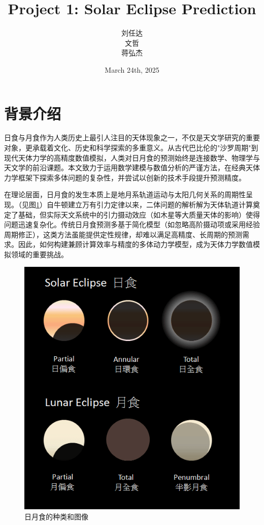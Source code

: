 \documentclass[hidelinks]{article}
\title{\textbf{Project 1: Solar Eclipse Prediction}}
\author{刘任达\\文哲\\蒋弘杰}
\date{March 24th, 2025}
\begin{document}
\hypersetup{bookmarksnumbered=true,}
\maketitle
\setcounter{tocdepth}{2}
\begin{Large}
\tableofcontents
\end{Large}%
\pagebreak

\section{背景介绍}
日食与月食作为人类历史上最引人注目的天体现象之一，不仅是天文学研究的重要对象，更承载着文化、历史和科学探索的多重意义。从古代巴比伦的"沙罗周期"到现代天体力学的高精度数值模拟，人类对日月食的预测始终是连接数学、物理学与天文学的前沿课题。本文致力于运用数学建模与数值分析的严谨方法，在经典天体力学框架下探索多体问题的复杂性，并尝试以创新的技术手段提升预测精度。

在理论层面，日月食的发生本质上是地月系轨道运动与太阳几何关系的周期性呈现。（见图\ref{fig:eclipse}）自牛顿建立万有引力定律以来，二体问题的解析解为天体轨道计算奠定了基础，但实际天文系统中的引力摄动效应（如木星等大质量天体的影响）使得问题迅速复杂化。传统日月食预测多基于简化模型（如忽略高阶摄动项或采用经验周期修正），这类方法虽能提供定性规律，却难以满足高精度、长周期的预测需求。因此，如何构建兼顾计算效率与精度的多体动力学模型，成为天体力学数值模拟领域的重要挑战。

\begin{figure}[htbp]
    \centering
    \includegraphics[width=0.5\linewidth]{images/ecltype.png}
    \caption{日月食的种类和图像}
    \label{fig:eclipse}
\end{figure}
\end{document}
